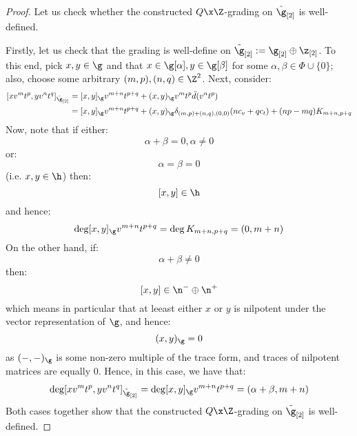             \begin{proof}
                Let us check whether the constructed $Q \x \Z$-grading on $\hat{\g}_{[2]}$ is well-defined.

                Firstly, let us check that the grading is well-define on $\tilde{\g}_{[2]} := \g_{[2]} \oplus \z_{[2]}$. To this end, pick $x, y \in \g$ and that $x \in \g[\alpha], y \in \g[\beta]$ for some $\alpha, \beta \in \Phi \cup \{0\}$; also, choose some arbitrary $(m, p), (n, q) \in \Z^2$. Next, consider:
                    $$
                        \begin{aligned}
                            [x v^m t^p, y v^n t^q]_{\tilde{\g}_{[2]}} & = [x, y]_{\g} v^{m + n} t^{p + q} + (x, y)_{\g} v^m t^p \bar{d}(v^n t^p)
                            \\
                            & = [x, y]_{\g} v^{m + n} t^{p + q} + (x, y)_{\g} \delta_{(m, p) + (n, q), (0, 0)} ( n c_v + q c_t ) + (np - mq) K_{m + n, p + q}
                        \end{aligned}
                    $$
                Now, note that if either:
                    $$\alpha + \beta = 0, \alpha \not = 0$$
                or:
                    $$\alpha = \beta = 0$$
                (i.e. $x, y \in \h$) then:
                    $$[x, y] \in \h$$
                and hence:
                    $$\deg [x, y]_{\g} v^{m + n} t^{p + q} = \deg K_{m + n, p + q} = (0, m + n)$$
                On the other hand, if:
                    $$\alpha + \beta \not = 0$$
                then:
                    $$[x, y] \in \n^- \oplus \n^+$$
                which means in particular that at leeast either $x$ or $y$ is nilpotent under the vector representation of $\g$, and hence:
                    $$(x, y)_{\g} = 0$$
                as $(-, -)_{\g}$ is some non-zero multiple of the trace form, and traces of nilpotent matrices are equally $0$. Hence, in this case, we have that:
                    $$\deg [x v^m t^p, y v^n t^q]_{\tilde{\g}_{[2]}} = \deg [x, y]_{\g} v^{m + n} t^{p + q} = (\alpha + \beta, m + n)$$
                Both cases together show that the constructed $Q \x \Z$-grading on $\tilde{\g}_{[2]}$ is well-defined. 
                

\end{proof}
